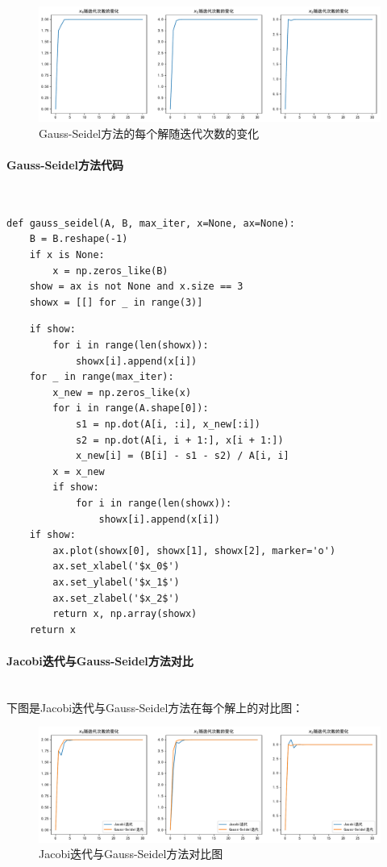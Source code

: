 \begin{figure}[H]
	\centering
	\caption{Gauss-Seidel方法的每个解随迭代次数的变化}
	\includegraphics[width=\linewidth]{fig16.pdf}
\end{figure}

\paragraph{Gauss-Seidel方法代码}
~\\
\begin{verbatim}
def gauss_seidel(A, B, max_iter, x=None, ax=None):
    B = B.reshape(-1)
    if x is None:
        x = np.zeros_like(B)
    show = ax is not None and x.size == 3
    showx = [[] for _ in range(3)]
\end{verbatim}
\begin{verbatim}
    if show:
        for i in range(len(showx)):
            showx[i].append(x[i])
    for _ in range(max_iter):
        x_new = np.zeros_like(x)
        for i in range(A.shape[0]):
            s1 = np.dot(A[i, :i], x_new[:i])
            s2 = np.dot(A[i, i + 1:], x[i + 1:])
            x_new[i] = (B[i] - s1 - s2) / A[i, i]
        x = x_new
        if show:
            for i in range(len(showx)):
                showx[i].append(x[i])
    if show:
        ax.plot(showx[0], showx[1], showx[2], marker='o')
        ax.set_xlabel('$x_0$')
        ax.set_ylabel('$x_1$')
        ax.set_zlabel('$x_2$')
        return x, np.array(showx)
    return x
\end{verbatim}

\paragraph{Jacobi迭代与Gauss-Seidel方法对比}
~\\
下图是Jacobi迭代与Gauss-Seidel方法在每个解上的对比图：

\begin{figure}[H]
	\centering
	\caption{Jacobi迭代与Gauss-Seidel方法对比图}
	\includegraphics[width=.9\linewidth]{fig17.pdf}
\end{figure}

